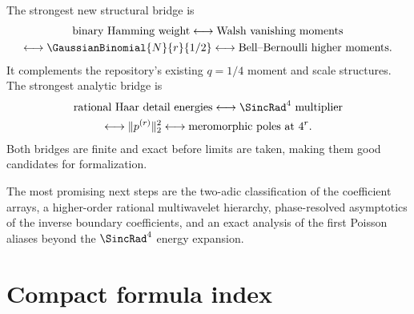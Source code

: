 \documentclass[11pt]{article}
\theoremstyle{definition}
\theoremstyle{remark}
\begin{document}
The strongest new structural bridge is
\[
 \begin{gathered}
 \text{binary Hamming weight}
 \longleftrightarrow
 \text{Walsh vanishing moments}\\
 \longleftrightarrow
 \GaussianBinomial{N}{r}{1/2}
 \longleftrightarrow
 \text{Bell--Bernoulli higher moments}.
 \end{gathered}
\]
It complements the repository's existing $q=1/4$ moment and scale structures.
The strongest analytic bridge is
\[
 \begin{gathered}
 \text{rational Haar detail energies}
 \longleftrightarrow
 \SincRad^4\text{ multiplier}\\
 \longleftrightarrow
 \|p^{(r)}\|_2^2
 \longleftrightarrow
 \text{meromorphic poles at }4^r.
 \end{gathered}
\]
Both bridges are finite and exact before limits are taken, making them good
candidates for formalization.

The most promising next steps are the two-adic classification of the coefficient
arrays, a higher-order rational multiwavelet hierarchy, phase-resolved
asymptotics of the inverse boundary coefficients, and an exact analysis of the
first Poisson aliases beyond the $\SincRad^4$ energy expansion.

\appendix

\section{Compact formula index}
\label{p3:app:formula-index}
\end{document}
